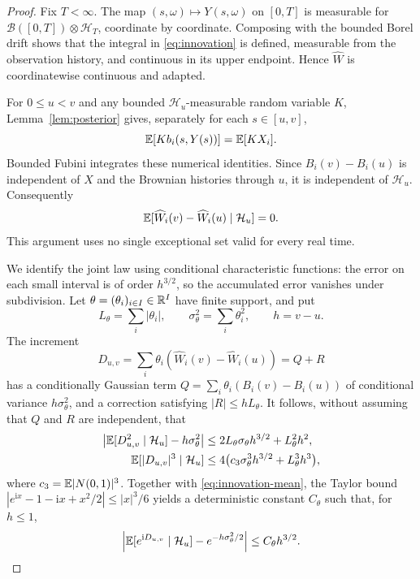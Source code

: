 \begin{proof}
Fix $T<\infty$. The map $(s,\omega)\mapsto Y(s,\omega)$ on $[0,T]$ is
measurable for $\mathcal B([0,T])\otimes\mathcal H_T$, coordinate by
coordinate. Composing with the bounded Borel drift shows that the integral
in \eqref{eq:innovation} is defined, measurable from the observation history,
and continuous in its upper endpoint. Hence $\widehat W$ is coordinatewise
continuous and adapted.

For $0\le u<v$ and any bounded $\mathcal H_u$-measurable random variable
$K$, Lemma~\ref{lem:posterior} gives, separately for each $s\in[u,v]$,
\[
 \mathbb E[Kb_i(s,Y(s))]=\mathbb E[KX_i].
\]
Bounded Fubini integrates these numerical identities. Since
$B_i(v)-B_i(u)$ is independent of $X$ and the Brownian histories through
$u$, it is independent of $\mathcal H_u$. Consequently
\begin{equation}\label{eq:innovation-mean}
 \mathbb E[\widehat W_i(v)-\widehat W_i(u)\mid\mathcal H_u]=0.
\end{equation}
This argument uses no single exceptional set valid for every real time.

We identify the joint law using conditional characteristic functions: the
error on each small interval is of order $h^{3/2}$, so the accumulated error
vanishes under subdivision. Let $\theta=(\theta_i)_{i\in I}\in\mathbb R^I$ have finite
support, and put
\[
 L_\theta=\sum_i|\theta_i|,\qquad
 \sigma_\theta^2=\sum_i\theta_i^2,\qquad h=v-u.
\]
The increment
\[
 D_{u,v}=\sum_i\theta_i(\widehat W_i(v)-\widehat W_i(u))=Q+R
\]
has a conditionally Gaussian term
$Q=\sum_i\theta_i(B_i(v)-B_i(u))$ of conditional variance
$h\sigma_\theta^2$, and a correction satisfying $|R|\le hL_\theta$.
It follows, without assuming that $Q$ and $R$ are independent, that
\begin{align*}
 \left|\mathbb E[D_{u,v}^2\mid\mathcal H_u]-h\sigma_\theta^2\right|
 &\le 2L_\theta\sigma_\theta h^{3/2}+L_\theta^2h^2,\\
 \mathbb E[|D_{u,v}|^3\mid\mathcal H_u]
 &\le 4\bigl(c_3\sigma_\theta^3h^{3/2}+L_\theta^3h^3\bigr),
\end{align*}
where $c_3=\mathbb E|N(0,1)|^3$. Together with
\eqref{eq:innovation-mean}, the Taylor bound
$|e^{\mathrm ix}-1-\mathrm ix+x^2/2|\le |x|^3/6$ yields a deterministic
constant $C_\theta$ such that, for $h\le1$,
\begin{equation}\label{eq:innovation-characteristic}
 \left|\mathbb E[e^{\mathrm iD_{u,v}}\mid\mathcal H_u]
       -e^{-h\sigma_\theta^2/2}\right|
 \le C_\theta h^{3/2}.
\end{equation}


\end{proof}

